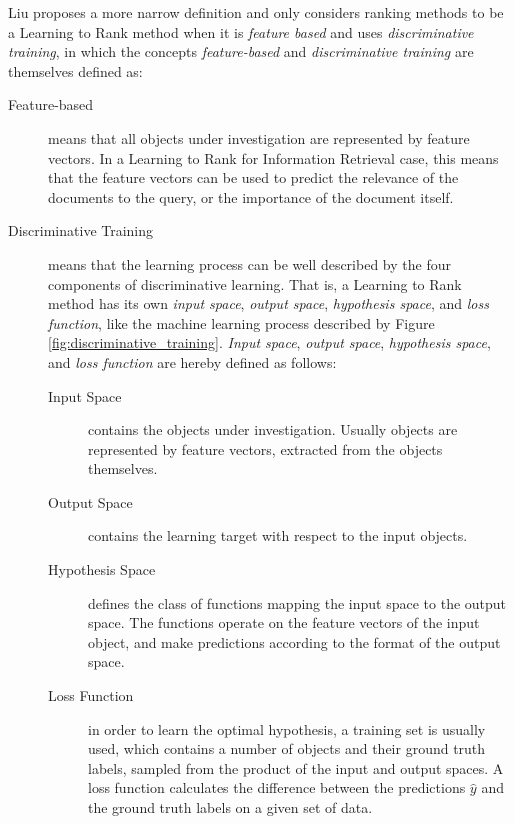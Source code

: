 Liu \cite{Liu2007} proposes a more narrow definition and only considers ranking methods to be a Learning to Rank method when it is \emph{feature based} and uses \emph{discriminative training}, in which the concepts \emph{feature-based} and \emph{discriminative training} are themselves defined as:
\begin{description}
\item[Feature-based]{means that all objects under investigation are represented by feature vectors. In a Learning to Rank for Information Retrieval case, this means that the feature vectors can be used to predict the relevance of the documents to the query, or the importance of the document itself.}
\item[Discriminative Training]{means that the learning process can be well described by the four components of discriminative learning. That is, a Learning to Rank method has its own \emph{input space}, \emph{output space}, \emph{hypothesis space}, and \emph{loss function}, like the machine learning process described by Figure \ref{fig:discriminative_training}. \emph{Input space}, \emph{output space}, \emph{hypothesis space}, and \emph{loss function} are hereby defined as follows:
	\begin{description}
	\item[Input Space]{contains the objects under investigation. Usually objects are represented by feature vectors, extracted from the objects themselves.}
	\item[Output Space]{contains the learning target with respect to the input objects.}
	\item[Hypothesis Space]{defines the class of functions mapping the input space to the output space. The functions operate on the feature vectors of the input object, and make predictions according to the format of the output space.}
	\item[Loss Function]{in order to learn the optimal hypothesis, a training set is usually used, which contains a number of objects and their ground truth labels, sampled from the product of the input and output spaces. A loss function calculates the difference between the predictions $\hat{y}$ and the ground truth labels on a given set of data.}
	\end{description}
	}
\end{description}


